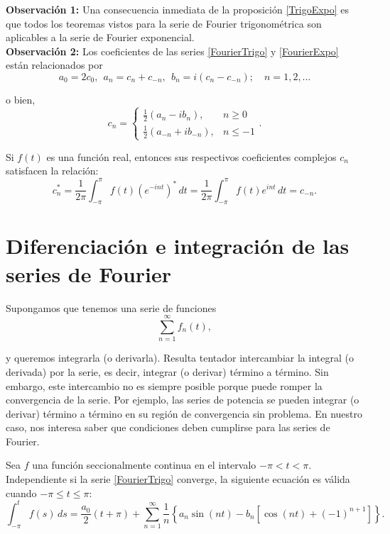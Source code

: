 \textbf{Observación 1:} Una consecuencia inmediata de la proposición \ref{TrigoExpo} es que todos los teoremas vistos para la serie de Fourier trigonométrica son aplicables a la serie de Fourier exponencial.
\\

\textbf{Observación 2:} Los coeficientes de las series \eqref{FourierTrigo} y \eqref{FourierExpo} están relacionados por 
\begin{equation}
a_0 = 2c_0,~~ a_n = c_n + c_{-n}, ~~ b_n = i(c_n - c_{-n}); \quad n = 1,2, \dots    \label{RelacionCoefi1}
\end{equation}

o bien, 
\begin{equation}
    c_n = \left\{ \begin{array}{cl}
        \frac{1}{2} (a_n - ib_n), & n \geq 0  \\
    \frac{1}{2}(a_{-n} + i b_{-n}),     & n  \leq -1 
    \end{array} \right. . \label{RelacionCoefi2}
\end{equation}

Si $f(t)$ es una función real, entonces sus respectivos coeficientes complejos $c_n$ satisfacen la relación:
$$c_n^* = \frac{1}{2\pi} \int_{-\pi}^{\pi} f(t) (e^{-int})^* \,dt = \frac{1}{2\pi} \int_{-\pi}^{\pi} f(t) e^{int} \,dt = c_{-n}.$$

\section{Diferenciación e integración de las series de Fourier}

Supongamos que tenemos una serie de funciones
$$\sum_{n=1}^{\infty} f_n(t),$$

y queremos integrarla (o derivarla). Resulta tentador intercambiar la integral (o derivada) por la serie, es decir, integrar (o derivar) término a término. Sin embargo, este intercambio no es siempre posible porque puede romper la convergencia de la serie. Por ejemplo, las series de potencia se pueden integrar (o derivar) término a término en su región de convergencia sin problema. En nuestro caso, nos interesa saber que condiciones deben cumplirse para las series de Fourier.

\begin{teorema}[Integración]
Sea $f$ una función seccionalmente continua en el intervalo $-\pi < t < \pi$. Independiente si la serie \eqref{FourierTrigo} converge, la siguiente ecuación es válida cuando $-\pi \leq t \leq \pi$:
\begin{equation*}
  \int_{-\pi}^t f(s) \,ds = \frac{a_0}{2} (t + \pi) + \sum_{n=1}^{\infty} \frac{1}{n} \left\{ a_n \sin(nt) - b_n[\cos(nt) + (-1)^{n+1}] \right\}.   
\end{equation*}
\end{teorema}


